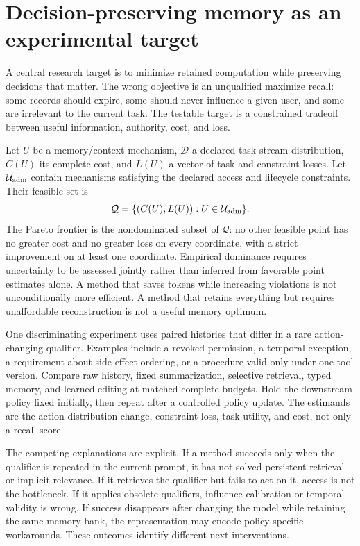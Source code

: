 \section{Decision-preserving memory as an experimental target}\label{sec:C34:02}
A central research target is to minimize retained computation while preserving decisions that matter. The wrong objective is an unqualified maximize recall: some records should expire, some should never influence a given user, and some are irrelevant to the current task. The testable target is a constrained tradeoff between useful information, authority, cost, and loss.

Let $U$ be a memory/context mechanism, $\mathcal D$ a declared task-stream distribution, $C(U)$ its complete cost, and $L(U)$ a vector of task and constraint losses. Let $\mathcal U_{\rm adm}$ contain mechanisms satisfying the declared access and lifecycle constraints. Their feasible set is
\begin{equation}
 \mathcal Q=\{(C(U),L(U)):U\in\mathcal U_{\rm adm}\}.
\end{equation}
The Pareto frontier is the nondominated subset of $\mathcal Q$: no other feasible point has no greater cost and no greater loss on every coordinate, with a strict improvement on at least one coordinate. Empirical dominance requires uncertainty to be assessed jointly rather than inferred from favorable point estimates alone. A method that saves tokens while increasing violations is not unconditionally more efficient. A method that retains everything but requires unaffordable reconstruction is not a useful memory optimum.

One discriminating experiment uses paired histories that differ in a rare action-changing qualifier. Examples include a revoked permission, a temporal exception, a requirement about side-effect ordering, or a procedure valid only under one tool version. Compare raw history, fixed summarization, selective retrieval, typed memory, and learned editing at matched complete budgets. Hold the downstream policy fixed initially, then repeat after a controlled policy update. The estimands are the action-distribution change, constraint loss, task utility, and cost, not only a recall score.

The competing explanations are explicit. If a method succeeds only when the qualifier is repeated in the current prompt, it has not solved persistent retrieval or implicit relevance. If it retrieves the qualifier but fails to act on it, access is not the bottleneck. If it applies obsolete qualifiers, influence calibration or temporal validity is wrong. If success disappears after changing the model while retaining the same memory bank, the representation may encode policy-specific workarounds. These outcomes identify different next interventions.

